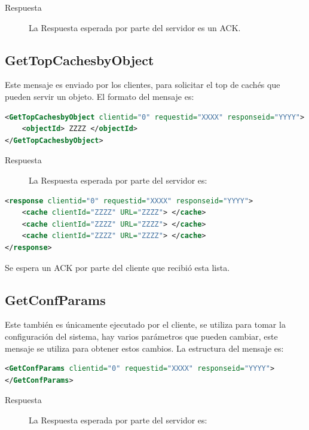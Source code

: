 \begin{description}
\item[Respuesta] La Respuesta esperada por parte del servidor es un ACK.
\end{description}

\subsection{GetTopCachesbyObject}

Este mensaje es enviado por los clientes, para solicitar el top de cachés que pueden servir un objeto. El formato del mensaje es:

\begin{lstlisting}[language=XML,caption=Mensaje de GetTopCachesbyObject]
<GetTopCachesbyObject clientid="0" requestid="XXXX" responseid="YYYY"> 
	<objectId> ZZZZ </objectId>
</GetTopCachesbyObject>
\end{lstlisting}


\begin{description}
\item[Respuesta] La Respuesta esperada por parte del servidor es:
\end{description}

\begin{lstlisting}[language=XML,caption=Mensaje de Respuesta de GetTopCachesbyObject]
<response clientid="0" requestid="XXXX" responseid="YYYY"> 
	<cache clientId="ZZZZ" URL="ZZZZ"> </cache>
	<cache clientId="ZZZZ" URL="ZZZZ"> </cache>
	<cache clientId="ZZZZ" URL="ZZZZ"> </cache>
</response>
\end{lstlisting}


Se espera un ACK por parte del cliente que recibió esta lista.

\subsection{GetConfParams}
Este también es únicamente ejecutado por el cliente, se utiliza para tomar la configuración del sistema, hay varios parámetros que pueden cambiar, este mensaje se utiliza para obtener estos cambios. La estructura del mensaje es:

\begin{lstlisting}[language=XML,caption=Mensaje de GetConfParams]
<GetConfParams clientid="0" requestid="XXXX" responseid="YYYY"> 
</GetConfParams>
\end{lstlisting}


\begin{description}
\item[Respuesta] La Respuesta esperada por parte del servidor es:
\end{description}

